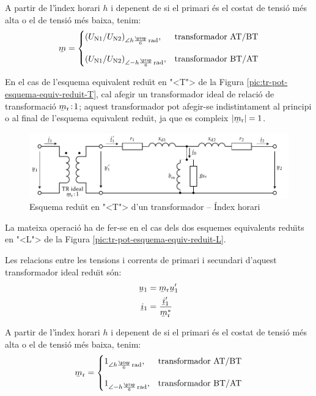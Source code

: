 A partir de l'\'{\i}ndex horari $h$ i depenent de si el primari \'{e}s el costat de tensi\'{o} m\'{e}s alta o el de tensi\'{o} m\'{e}s baixa, tenim:
\begin{equation}
\cmplx{m} = \begin{cases}
     (U\ped{N1}/U\ped{N2})_{\angle h \frac{\piup}{6}\unit{rad}}, & \text{transformador AT/BT}\\[2.7ex]
     (U\ped{N1}/U\ped{N2})_{\angle -h \frac{\piup}{6}\unit{rad}}, & \text{transformador BT/AT}
\end{cases}
\label{eq:rel-transf-cmplx}
\end{equation}

En el cas de l'esquema equivalent redu\"{\i}t en {"<}T{">} de la Figura \vref{pic:tr-pot-esquema-equiv-reduit-T}, cal afegir un transformador ideal de relaci\'{o} de transformaci\'{o}  $\cmplx{m}\ped{r}\!:\!1$; aquest transformador pot afegir-se indistintament  al principi o al final de l'esquema equivalent redu\"{\i}t, ja que es compleix $|\cmplx{m}\ped{r}|=1$.
\begin{figure}[htb]
\centering
    \includegraphics{Imatges/Cap-TrafosPot-Esq-Equiv-Reduit-T-Complex.pdf}
\caption{Esquema redu\"{\i}t en {"<}T{">} d'un transformador -- \'{I}ndex horari}
\label{fig:esq-reduit-T-complex}
\end{figure}

La mateixa operaci\'{o} ha de fer-se en el cas dels dos esquemes equivalents redu\"{\i}ts en {"<}L{">} de la Figura \vref{pic:tr-pot-esquema-equiv-reduit-L}.

Les relacions entre les tensions i corrents de primari i secundari d'aquest transformador ideal redu\"{\i}t s\'{o}n:
\begin{subequations}
\begin{align}
    \cmplx{u}_1 &= \cmplx{m}\ped{r}\cmplx{u}'_1\\  \cmplx{i}_1 &= \frac{\cmplx{i}'_1}{\cmplx{m}^*\ped{r}}
\end{align}
\end{subequations}

A partir de l'\'{\i}ndex horari $h$ i depenent de si el primari \'{e}s el costat de tensi\'{o} m\'{e}s alta o el de tensi\'{o} m\'{e}s baixa, tenim:
\begin{equation}
\cmplx{m}\ped{r} = \begin{cases}
      1_{\angle h\frac{\piup}{6}\unit{rad}}, & \text{transformador AT/BT}\\[2.7ex]
      1_{\angle -h\frac{\piup}{6}\unit{rad}}, & \text{transformador BT/AT}
\end{cases}
\label{eq:rel-transf-cmplx-reduit}
\end{equation}

